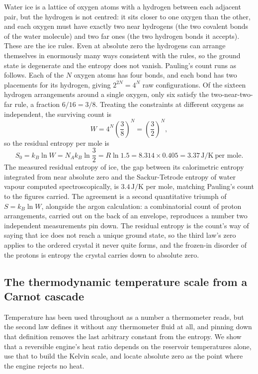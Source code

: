 Water ice is a lattice of oxygen atoms with a hydrogen between each adjacent
pair, but the hydrogen is not centred: it sits closer to one oxygen than the
other, and each oxygen must have exactly two near hydrogens (the two covalent
bonds of the water molecule) and two far ones (the two hydrogen bonds it
accepts). These are the ice rules. Even at absolute zero the hydrogens can
arrange themselves in enormously many ways consistent with the rules, so the
ground state is degenerate and the entropy does not vanish. Pauling's count runs
as follows. Each of the $N$ oxygen atoms has four bonds, and each bond has two
placements for its hydrogen, giving $2^{2N} = 4^N$ raw configurations. Of the
sixteen hydrogen arrangements around a single oxygen, only six satisfy the
two-near-two-far rule, a fraction $6/16 = 3/8$. Treating the constraints at
different oxygens as independent, the surviving count is
\[
W = 4^N \left(\frac{3}{8}\right)^N = \left(\frac{3}{2}\right)^N,
\]
so the residual entropy per mole is
\[
S_0 = k_B \ln W = N_A k_B \ln\frac{3}{2} = R\ln 1.5
= 8.314 \times 0.405 = 3.37\,\si{\joule\per\kelvin}\ \text{per mole}.
\]
The measured residual entropy of ice, the gap between its calorimetric entropy
integrated from near absolute zero and the Sackur-Tetrode entropy of water
vapour computed spectroscopically, is $3.4\,\si{\joule\per\kelvin}$ per mole,
matching Pauling's count to the figures carried. The agreement is a second
quantitative triumph of $S = k_B \ln W$, alongside the argon calculation: a
combinatorial count of proton arrangements, carried out on the back of an
envelope, reproduces a number two independent measurements pin down. The
residual entropy is the count's way of saying that ice does not reach a unique
ground state, so the third law's zero applies to the ordered crystal it never
quite forms, and the frozen-in disorder of the protons is entropy the crystal
carries down to absolute zero.

\subsection{The thermodynamic temperature scale from a Carnot cascade}

Temperature has been used throughout as a number a thermometer reads, but the
second law defines it without any thermometer fluid at all, and pinning down that
definition removes the last arbitrary constant from the entropy. We show that a
reversible engine's heat ratio depends on the reservoir temperatures alone, use
that to build the Kelvin scale, and locate absolute zero as the point where the
engine rejects no heat.

